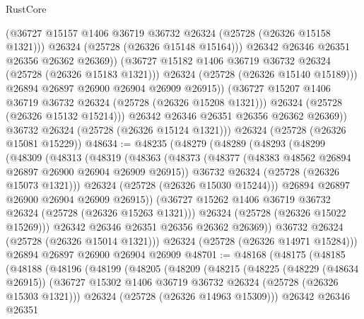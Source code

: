 \begin{lexlean}{RustCore}
\begin{coremodule}
                        (@36727 @15157 @1406 @36719 @36732 @26324 (@25728 (@26326 @15158 @1321)))
                        @26324
                        (@25728 (@26326 @15148 @15164)))
                      @26342
                      @26346
                      @26351
                      @26356
                      @26362
                      @26369))
                  (@36727 @15182 @1406 @36719 @36732 @26324 (@25728 (@26326 @15183 @1321)))
                  @26324
                  (@25728 (@26326 @15140 @15189)))
                @26894
                @26897
                @26900
                @26904
                @26909
                @26915))
            (@36727 @15207 @1406 @36719 @36732 @26324 (@25728 (@26326 @15208 @1321)))
            @26324
            (@25728 (@26326 @15132 @15214)))
          @26342
          @26346
          @26351
          @26356
          @26362
          @26369))
      @36732
      @26324
      (@25728 (@26326 @15124 @1321)))
    @26324
    (@25728 (@26326 @15081 @15229))
@48634 := @48235
    (@48279
      (@48289
        (@48293
          (@48299
            (@48309
              (@48313
                (@48319
                  (@48363
                    (@48373
                      (@48377 (@48383 @48562 @26894 @26897 @26900 @26904 @26909 @26915))
                      @36732
                      @26324
                      (@25728 (@26326 @15073 @1321)))
                    @26324
                    (@25728 (@26326 @15030 @15244)))
                  @26894
                  @26897
                  @26900
                  @26904
                  @26909
                  @26915))
              (@36727 @15262 @1406 @36719 @36732 @26324 (@25728 (@26326 @15263 @1321)))
              @26324
              (@25728 (@26326 @15022 @15269)))
            @26342
            @26346
            @26351
            @26356
            @26362
            @26369))
        @36732
        @26324
        (@25728 (@26326 @15014 @1321)))
      @26324
      (@25728 (@26326 @14971 @15284)))
    @26894
    @26897
    @26900
    @26904
    @26909
@48701 := @48168
    (@48175
      (@48185
        (@48188
          (@48196
            (@48199
              (@48205
                (@48209
                  (@48215
                    (@48225
                      (@48229 (@48634 @26915))
                      (@36727 @15302 @1406 @36719 @36732 @26324 (@25728 (@26326 @15303 @1321)))
                      @26324
                      (@25728 (@26326 @14963 @15309)))
                    @26342
                    @26346
                    @26351

\end{coremodule}
\end{lexlean}
